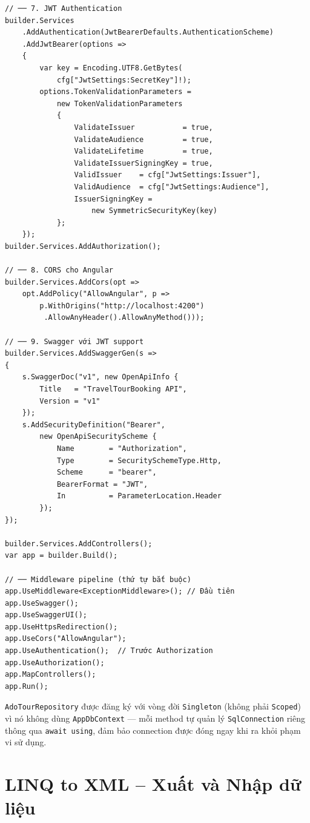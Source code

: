 \begin{lstlisting}[style=csharp,
  caption={Program.cs -- đăng ký DI đầy đủ của hệ thống},
  label={lst:di}]
// ── 7. JWT Authentication
builder.Services
    .AddAuthentication(JwtBearerDefaults.AuthenticationScheme)
    .AddJwtBearer(options =>
    {
        var key = Encoding.UTF8.GetBytes(
            cfg["JwtSettings:SecretKey"]!);
        options.TokenValidationParameters =
            new TokenValidationParameters
            {
                ValidateIssuer           = true,
                ValidateAudience         = true,
                ValidateLifetime         = true,
                ValidateIssuerSigningKey = true,
                ValidIssuer    = cfg["JwtSettings:Issuer"],
                ValidAudience  = cfg["JwtSettings:Audience"],
                IssuerSigningKey =
                    new SymmetricSecurityKey(key)
            };
    });
builder.Services.AddAuthorization();

// ── 8. CORS cho Angular
builder.Services.AddCors(opt =>
    opt.AddPolicy("AllowAngular", p =>
        p.WithOrigins("http://localhost:4200")
         .AllowAnyHeader().AllowAnyMethod()));

// ── 9. Swagger với JWT support
builder.Services.AddSwaggerGen(s =>
{
    s.SwaggerDoc("v1", new OpenApiInfo {
        Title   = "TravelTourBooking API",
        Version = "v1"
    });
    s.AddSecurityDefinition("Bearer",
        new OpenApiSecurityScheme {
            Name        = "Authorization",
            Type        = SecuritySchemeType.Http,
            Scheme      = "bearer",
            BearerFormat = "JWT",
            In          = ParameterLocation.Header
        });
});

builder.Services.AddControllers();
var app = builder.Build();

// ── Middleware pipeline (thứ tự bắt buộc)
app.UseMiddleware<ExceptionMiddleware>(); // Đầu tiên
app.UseSwagger();
app.UseSwaggerUI();
app.UseHttpsRedirection();
app.UseCors("AllowAngular");
app.UseAuthentication();  // Trước Authorization
app.UseAuthorization();
app.MapControllers();
app.Run();
\end{lstlisting}

\begin{rem}
\texttt{AdoTourRepository} được đăng ký với vòng đời
\texttt{Singleton} (không phải \texttt{Scoped}) vì nó không
dùng \texttt{AppDbContext} — mỗi method tự quản lý
\texttt{SqlConnection} riêng thông qua \texttt{await using},
đảm bảo connection được đóng ngay khi ra khỏi phạm vi sử dụng.
\end{rem}

\section{LINQ to XML -- Xuất và Nhập dữ liệu}\label{Sec3.7}

